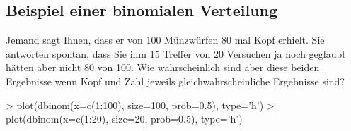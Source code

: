 \subsection{Beispiel einer binomialen Verteilung}
Jemand sagt Ihnen, dass er von 100 Münzwürfen 80 mal Kopf erhielt.
Sie antworten spontan, dass Sie ihm 15 Treffer von 20 Versuchen ja 
noch geglaubt hätten aber nicht 80 von 100. 
Wie wahrscheinlich sind aber diese beiden Ergebnisse wenn Kopf 
und Zahl jeweils gleichwahrscheinliche Ergebnisse sind?

\begin{Schunk}
\begin{Sinput}
> plot(dbinom(x=c(1:100), size=100, prob=0.5), type='h')
> plot(dbinom(x=c(1:20), size=20, prob=0.5), type='h')
\end{Sinput}
\end{Schunk}



